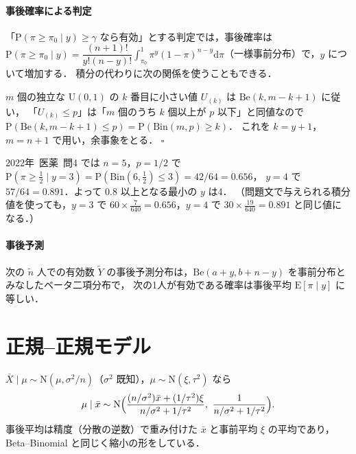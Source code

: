 \documentclass[a4paper,11pt,openany]{ltjsbook}
\newtheorem{meidai}[teigi]{命題}
\newenvironment{proof}[1][証明]{\par\smallskip\noindent{\sffamily\bfseries #1}\quad\ignorespaces}{\nobreak\hfill$\square$\par\medskip}
\newcommand{\kakomon}[2]{\mbox{#1年 医薬 問#2}}
\newcommand{\E}{\mathrm{E}}
\newcommand{\Prob}{\mathrm{P}}
\newcommand{\dd}{\mathrm{d}}
\newcommand{\Normal}{\mathrm{N}}
\newcommand{\Bin}{\mathrm{Bin}}
\newcommand{\Be}{\mathrm{Be}}
\newcommand{\Unif}{\mathrm{U}}
\begin{document}
\paragraph{事後確率による判定}
「$\Prob(\pi\ge\pi_0\mid y)\ge\gamma$ なら有効」とする判定では，事後確率は
$\Prob(\pi\ge\pi_0\mid y)=\dfrac{(n+1)!}{y!(n-y)!}\displaystyle\int_{\pi_0}^1\pi^y(1-\pi)^{n-y}\dd\pi$（一様事前分布）で，$y$ について増加する．
積分の代わりに次の関係を使うこともできる．
\begin{proof}
$m$ 個の独立な $\Unif(0,1)$ の $k$ 番目に小さい値 $U_{(k)}$ は $\Be(k,m-k+1)$ に従い，
「$U_{(k)}\le p$」は「$m$ 個のうち $k$ 個以上が $p$ 以下」と同値なので $\Prob(\Be(k,m-k+1)\le p)=\Prob(\Bin(m,p)\ge k)$．
これを $k=y+1$，$m=n+1$ で用い，余事象をとる．
\end{proof}
\kakomon{2022}{4} では $n=5$，$p=1/2$ で $\Prob(\pi\ge\frac12\mid y=3)=\Prob(\Bin(6,\tfrac12)\le3)=42/64=0.656$，
$y=4$ で $57/64=0.891$．よって $0.8$ 以上となる最小の $y$ は4．
（問題文で与えられる積分値を使っても，$y=3$ で $60\times\frac{7}{640}=0.656$，$y=4$ で $30\times\frac{19}{640}=0.891$ と同じ値になる．）

\paragraph{事後予測}
次の $\tilde n$ 人での有効数 $\tilde Y$ の事後予測分布は，$\Be(a+y,b+n-y)$ を事前分布とみなしたベータ二項分布で，
次の1人が有効である確率は事後平均 $\E[\pi\mid y]$ に等しい．

\section{正規--正規モデル}\label{sec:17-normal}
$\bar X\mid\mu\sim\Normal(\mu,\sigma^2/n)$（$\sigma^2$ 既知），$\mu\sim\Normal(\xi,\tau^2)$ なら
\[
\mu\mid\bar x\sim\Normal\Bigl(\frac{(n/\sigma^2)\bar x+(1/\tau^2)\xi}{n/\sigma^2+1/\tau^2},\ \frac{1}{n/\sigma^2+1/\tau^2}\Bigr).
\]
事後平均は精度（分散の逆数）で重み付けた $\bar x$ と事前平均 $\xi$ の平均であり，Beta--Binomial と同じく縮小の形をしている．
\end{document}
